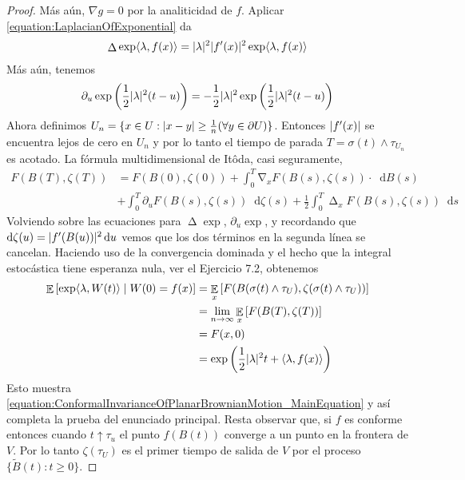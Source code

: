 \documentclass{article}
\newcommand{\ito}{Itô}
\newcommand{\dd}{\mathop{}\!\mathrm{d}}
\DeclareMathOperator{\laplacian}{\Delta}
\DeclareMathOperator{\grad}{\nabla}
\DeclareMathOperator{\Expectation}{\mathbb{E}}
\DeclarePairedDelimiter{\abs}{\lvert}{\rvert}
\DeclarePairedDelimiter{\ang}{\langle}{\rangle}
\theoremstyle{plain}
\theoremstyle{remark}
\begin{document}
\begin{proof}
  Más aún, \(\nabla g = 0\) por la analiticidad de \(f\).
  Aplicar \ref{equation:LaplacianOfExponential} da
  \begin{align}
    \laplacian \exp \ang{\lambda, f(x)}
    =
    \abs{\lambda}^2 \abs{f'(x)}^2 \exp \ang{\lambda, f(x)}
  \end{align}
  Más aún, tenemos
  \begin{align}
    \partial_u \exp\left( \frac{1}{2} \abs{\lambda}^2 (t - u) \right)
    =
    - \frac{1}{2} \abs{\lambda}^2 \exp\left( \frac{1}{2} \abs{\lambda}^2 (t - u)\right)
  \end{align}
  Ahora definimos \(U_n = \{x \in U : \abs{x - y} \geq \frac{1}{n} (\forall y \in \partial U)\}\).
  Entonces \(\abs{f'(x)}\) se encuentra lejos de cero en \(U_n\) y por lo tanto el tiempo de parada \(T = \sigma(t) \wedge \tau_{U_n}\) es acotado.
  La fórmula multidimensional de \ito da, casi seguramente,
  \begin{align}
    F(B(T), \zeta(T))
    &=
    F(B(0), \zeta(0))
    + \int_0^T \grad_x F(B(s), \zeta(s)) \cdot \dd B(s)
    \\
    &+
    \int_0^T \partial_u F(B(s), \zeta(s)) \dd \zeta(s)
    + \frac{1}{2} \int_0^T \laplacian_x F(B(s), \zeta(s)) \dd s
  \end{align}
  Volviendo sobre las ecuaciones para \(\laplacian \exp\), \(\partial_u \exp\), y recordando que \(\dd \zeta(u) = \abs{f'(B(u))}^2 \dd u\) vemos que los dos términos en la segunda línea se cancelan.
  Haciendo uso de la convergencia dominada y el hecho que la integral estocástica tiene esperanza nula, ver el Ejercicio 7.2, obtenemos
  \begin{align}
    \Expectation \left[
      \exp \ang{\lambda, W(t)}
      \mid
      W(0) = f(x)
    \right]
    &=
    \Expectation_x \left[ F(B(\sigma(t) \wedge \tau_U), \zeta(\sigma(t) \wedge \tau_U))\right]
    \\
    &=
    \lim_{n \rightarrow \infty} \Expectation_x \left[F(B(T), \zeta(T))\right]
    \\
    &=
    F(x, 0)
    \\
    &=
    \exp \left( \frac{1}{2} \abs{\lambda}^2 t + \ang{\lambda, f(x)} \right)
  \end{align}
  Esto muestra \eqref{equation:ConformalInvarianceOfPlanarBrownianMotion_MainEquation} y así completa la prueba del enunciado principal.
  Resta observar que, si \(f\) es conforme entonces cuando \(t \uparrow \tau_u\) el punto \(f(B(t))\) converge a un punto en la frontera de \(V\).
  Por lo tanto \(\zeta(\tau_U)\) es el primer tiempo de salida de \(V\) por el proceso \(\{\widetilde{B}(t) : t \geq 0\}\).
\end{proof}
\end{document}
